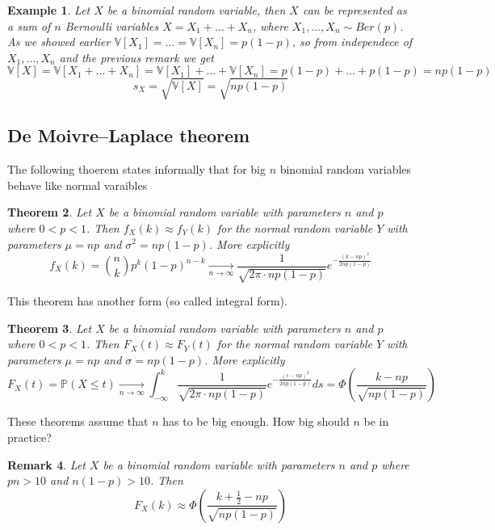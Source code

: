 \documentclass[12pt]{article}
\newtheorem{theorem}{Theorem}[subsection]
\newtheorem{remark}[theorem]{Remark}
\newtheorem{example}[theorem]{Example}
\begin{document}
\begin{example} Let $X$ be a binomial random variable, then $X$ can be
    represented as a sum of $n$ Bernoulli variables
    $X=X_1+\ldots+X_n$,  %
    where $X_1,\ldots,X_n\sim Ber(p)$. As we showed earlier
    $\mathbb{V}[X_1]=\ldots=\mathbb{V}[X_n]=p(1-p)$,   %
    so from independece of
    $X_1,\ldots, X_n$ and the previous remark we get
    $$
        \mathbb{V}[X]
        =\mathbb{V}[X_1+\ldots+X_n]    %
        =\mathbb{V}[X_1]+\ldots+\mathbb{V}[X_n]    %
        =p(1-p)+\ldots+p(1-p)=np(1-p)    %
    $$
    $$
        s_X=\sqrt{\mathbb{V}[X]}=\sqrt{np(1-p)}
    $$
\end{example}

\subsection{De Moivre–Laplace theorem}

The following thoerem states informally that for big $n$ binomial random
variables behave like normal varaibles

\begin{theorem} Let $X$ be a binomial random variable with parameters $n$ and
    $p$ where $0<p<1$. Then $f_X(k)\approx f_Y(k)$ for the normal random
    variable $Y$ with parameters $\mu=np$ and $\sigma^2=np(1-p)$. More
    explicitly
    $$
        f_X(k)
        =\binom{n}{k}p^k {(1-p)}^{n-k}
        \underset{n\to\infty}{\to}
        \frac{1}{\sqrt{2\pi \cdot np(1-p)}}e^{-\frac{{(k-np)}^2}{2np(1-p)}}
    $$
\end{theorem}

This theorem has another form (so called integral form).

\begin{theorem} Let $X$ be a binomial random variable with parameters $n$ and
    $p$ where $0<p<1$. Then $F_X(t)\approx F_Y(t)$ for the normal random
    variable $Y$ with parameters $\mu=np$ and $\sigma=np(1-p)$. More explicitly
    $$
        F_X(t)
        =\mathbb{P}(X\leq t)
        \underset{n\to\infty}{\to}
        \int_{-\infty}^k
        \frac{1}{\sqrt{2\pi \cdot np(1-p)}}
        e^{-\frac{{(s-np)}^2}{2np(1-p)}}ds
        =\Phi\left(\frac{k-np}{\sqrt{np(1-p)}}\right)
    $$
\end{theorem}

These theorems assume that $n$ has to be big enough. How big should $n$ be in
practice?

\begin{remark} Let $X$ be a binomial random variable with parameters $n$ and $p$
    where $pn>10$ and $n(1-p)>10$.  Then
    $$
        F_X(k)\approx\Phi\left(\frac{k+\frac{1}{2}-np}{\sqrt{np(1-p)}}\right)
    $$
\end{remark}
\end{document}
